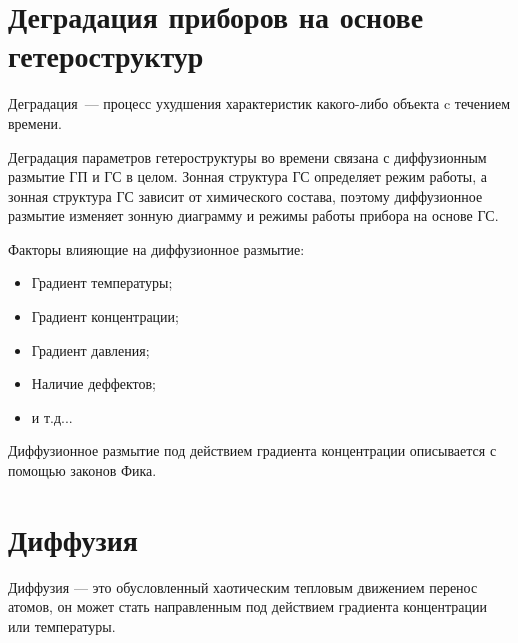 \section{Деградация приборов на основе гетероструктур}
Деградация~--- процесс ухудшения характеристик какого-либо объекта c течением времени.


Деградация параметров гетероструктуры во времени связана с диффузионным размытие ГП и ГС в целом. Зонная структура ГС определяет режим работы, а зонная структура ГС зависит от химического состава, поэтому диффузионное размытие изменяет зонную диаграмму и режимы работы прибора на основе ГС.


Факторы влияющие на диффузионное размытие: 
\begin{itemize}
	\item Градиент температуры; 
	\item Градиент концентрации; 
	\item Градиент давления;
	\item Наличие деффектов;
	\item и т.д... 
\end{itemize}

Диффузионное размытие под действием градиента концентрации описывается с помощью законов Фика.

\section{Диффузия}
Диффузия — это обусловленный хаотическим тепловым движением перенос атомов, он может стать направленным под действием градиента концентрации или температуры.

